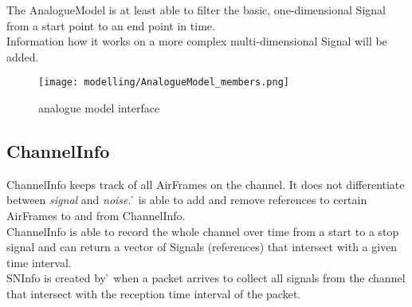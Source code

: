 %

The AnalogueModel is at least able to filter the basic, one-dimensional Signal from a start point to an end point in time.\\

Information how it works on a more complex multi-dimensional Signal will be added.
 
\begin{figure}[H]
 \centering
 \texttt{[image: modelling/AnalogueModel\_members.png]}
 \caption{analogue model interface}
 \label{fig: analogue model interface}
\end{figure}
%





\subsection{ChannelInfo}

ChannelInfo keeps track of all AirFrames on the channel. It does not differentiate between \textit{signal} and \textit{noise}. \h{\bp} is able to
add and remove references to certain AirFrames to and from ChannelInfo.\\
ChannelInfo is able to record the whole channel over time from a start to a stop signal and can return a vector of Signals (references) that intersect with a given time interval.\\
SNInfo is created by \h{\bp} when a packet arrives to collect all signals from the channel that intersect with the reception time interval of the packet.

